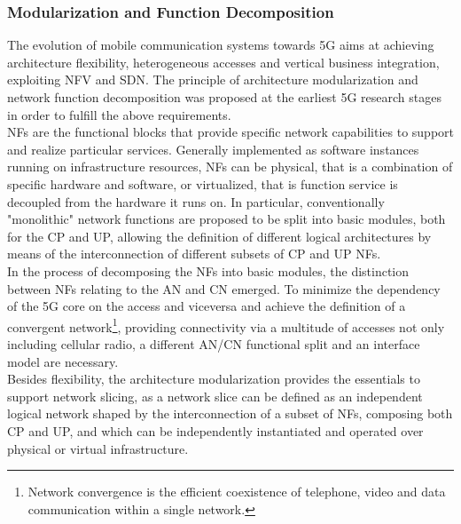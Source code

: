 \documentclass[a4paper,12pt]{report} %
\begin{document}
\subsubsection{Modularization and Function Decomposition}
The evolution of mobile communication systems towards 5G aims at achieving
architecture flexibility, heterogeneous accesses and vertical business integration, exploiting NFV and SDN. The principle of architecture
modularization and network function decomposition was proposed at the earliest 5G research
stages in order to fulfill the above requirements.\\ 
\gls{NF}s are the functional blocks
that provide specific network capabilities to support and realize particular services. Generally implemented
as software instances running on infrastructure
resources, NFs can be physical, that is a combination
of specific hardware and software, or virtualized, that is function service is
decoupled from the hardware it runs on. In particular, conventionally "monolithic" network functions are proposed to be split into basic modules, both for the \gls{CP} and \gls{UP}, allowing the definition of different logical architectures by means of the interconnection of
different subsets of CP and UP NFs.\\
In the process of decomposing the NFs into basic modules, the distinction between NFs relating to
the \gls{AN} and CN emerged. To minimize the dependency of the 5G
core on the access and viceversa and achieve the definition of a convergent network\footnote{Network convergence is the efficient coexistence of telephone, video and data communication within a single network.}, providing
connectivity via a multitude of accesses not only including cellular radio, a different AN/CN functional split and an interface model are necessary.\\
Besides flexibility, the architecture modularization provides the essentials to support network
­slicing, as a network slice can be defined as an independent logical network shaped by the interconnection of a subset of NFs, composing both CP and UP, and which can be independently instantiated
and operated over physical or virtual infrastructure.
\end{document}
